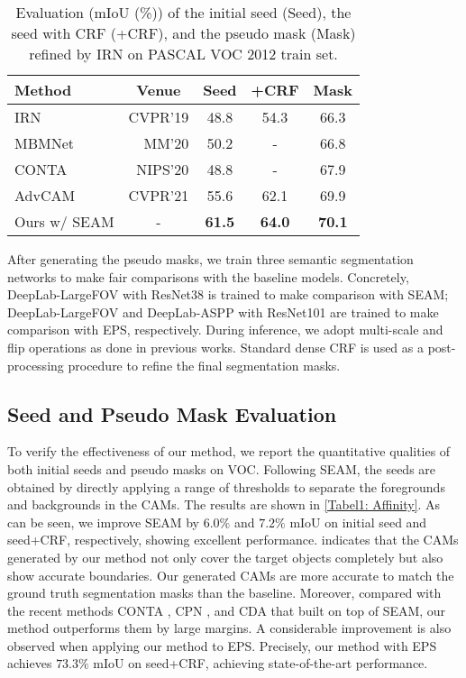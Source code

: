 \documentclass[10pt,twocolumn,letterpaper]{article}
\begin{document}
\begin{table}[tbp]
\caption{Evaluation (mIoU (\%)) of the initial seed (Seed), the seed with CRF (+CRF), and the pseudo mask (Mask) refined by IRN \cite{ahn2019weaklyIRNet} on PASCAL VOC 2012 train set.}
\small
\label{Table2: IRNet}
\centering
{}
\begin{tabular}{l|c|c|c|c}
\hline
\textbf{Method}          & \textbf{Venue}   & \textbf{Seed} & \textbf{+CRF} & \textbf{Mask} \\
\hline \hline
IRN \cite{ahn2019weaklyIRNet}            & \multicolumn{1}{r|}{CVPR'19} & 48.8 & 54.3 & 66.3 \\
MBMNet \cite{liu2020weaklyMBMNet}         & \multicolumn{1}{r|}{MM'20}   & 50.2 & -    & 66.8 \\
CONTA \cite{zhang2020causalCONTA}          & \multicolumn{1}{r|}{NIPS'20} & 48.8 & -    & 67.9 \\
AdvCAM \cite{lee2021antiADVCAM}         & \multicolumn{1}{r|}{CVPR'21} & 55.6 & 62.1 & 69.9 \\ 
\hline
Ours w/ SEAM & -       & \textbf{61.5} & \textbf{64.0} &\textbf{70.1} \\
\hline
\end{tabular}
\end{table}

After generating the pseudo masks, we train three semantic segmentation networks to make fair comparisons with the baseline models. Concretely, DeepLab-LargeFOV with ResNet38 is trained to make comparison with SEAM; DeepLab-LargeFOV and DeepLab-ASPP with ResNet101 are trained to make comparison with EPS, respectively.
During inference, we adopt multi-scale and flip operations as done in previous works.
Standard dense CRF is used as a post-processing procedure to refine the final segmentation masks. 



\subsection{Seed and Pseudo Mask Evaluation}
To verify the effectiveness of our method, we report the quantitative qualities of both initial seeds and pseudo masks on VOC. Following SEAM, the seeds are obtained by directly applying a range of thresholds to separate the foregrounds and backgrounds in the CAMs. The results are shown in \cref{Tabel1: Affinity}.
As can be seen, we improve SEAM by $6.0\%$ and $7.2\%$ mIoU on initial seed and seed+CRF, respectively, showing excellent performance.
 indicates that the CAMs generated by our method not only cover the target objects completely but also show accurate boundaries.
Our generated CAMs are more accurate to match the ground truth segmentation masks than the baseline.
Moreover, compared with the recent methods CONTA \cite{zhang2020causalCONTA}, CPN \cite{zhang2021complementaryCPN}, and CDA \cite{Su_2021_ICCV_CDA} that built on top of SEAM, our method outperforms them by large margins.
A considerable improvement is also observed when applying our method to EPS.
Precisely, our method with EPS achieves $73.3\%$ mIoU on seed+CRF, achieving state-of-the-art performance.
\end{document}
